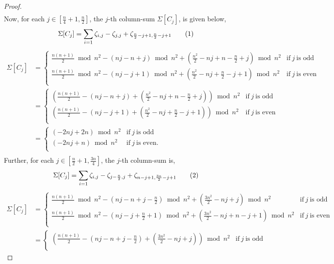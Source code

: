 \documentclass[preprint,11pt]{elsarticle}
\newcommand\numberthis{\addtocounter{equation}{1}\tag{\theequation}}
\begin{document}
\begin{proof}
\begin{align*}
\end{align*}
Now, for each $j\in [\frac{n}{4}+1, \frac{n}{2}]$, the $j$-th column-sum $\Sigma[C_j]$, is given below, 
\[\Sigma[C_j]= \sum_{i=1}\zeta_{i,j}-\zeta_{j,j}+\zeta_{\frac{n}{2}-j+1, \frac{n}{2}-j+1}\numberthis\]
\begin{align*}
     \Sigma[C_j] & =\begin{cases}
        \frac{n(n+1)}{2}\bmod{n^2}-(nj-n+j)\bmod{n^2}+(\frac{n^2}{2}-nj+n-\frac{n}{2}+j)\bmod{n^2} & \text{if}~ j ~ \text{is odd}\\ 
         \frac{n(n+1)}{2}\bmod{n^2}-(nj-j+1)\bmod{n^2}+(\frac{n^2}{2}-nj+\frac{n}{2}-j+1)\bmod{n^2} & \text{if}~ j ~ \text{is even}\\ 
    \end{cases}\\[6pt]
    & = \begin{cases}
        (\frac{n(n+1)}{2}-(nj-n+j)+(\frac{n^2}{2}-nj+n-\frac{n}{2}+j))\bmod{n^2} & \text{if}~ j ~ \text{is odd}\\ 
         (\frac{n(n+1)}{2}-(nj-j+1)+(\frac{n^2}{2}-nj+\frac{n}{2}-j+1))\bmod{n^2} & \text{if}~ j ~ \text{is even}\\ 
    \end{cases}\\[6pt]
    &  =\begin{cases}
       (-2nj+2n)\bmod{n^2} & \text{if}~ j ~ \text{is odd}\\ 
        (-2nj+n)\bmod{n^2} & \text{if}~ j ~ \text{is even}.\\ 
           \end{cases}\\
\end{align*}
Further, for each $j \in[\frac{n}{2}+1, \frac{3n}{4}]$, the $j$-th column-sum is, 
\[\Sigma[C_j]= \sum_{i=1}\zeta_{i,j}-\zeta_{j-\frac{n}{2}, j}+\zeta_{n-j+1,\frac{3n}{2} - j +1}\numberthis\]
\begin{align*}
     \Sigma[C_j] & =\begin{cases}
        \frac{n(n+1)}{2}\bmod{n^2}-(nj-n+j-\frac{n}{2})\bmod{n^2}+(\frac{3n^2}{2}-nj+j)\bmod{n^2} & \text{if}~ j ~ \text{is odd}\\ 
         \frac{n(n+1)}{2}\bmod{n^2}-(nj-j+\frac{n}{2}+1)\bmod{n^2}+(\frac{3n^2}{2}-nj+n-j+1)\bmod{n^2} & \text{if}~ j ~ \text{is even}\\ 
    \end{cases}\\[6pt]
    & = \begin{cases}
        \left(\frac{n(n+1)}{2}-(nj-n+j-\frac{n}{2})+(\frac{3n^2}{2}-nj+j)\right)\bmod{n^2} & \text{if}~ j ~ \text{is odd}\\ 

\end{cases}
\end{align*}
\end{proof}
\end{document}
